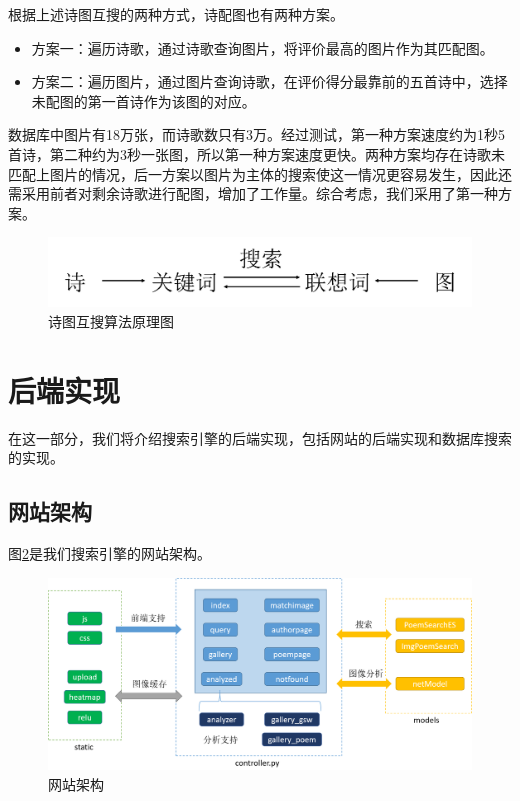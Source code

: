 \documentclass[a4paper, 10pt]{article}
\begin{document}
根据上述诗图互搜的两种方式，诗配图也有两种方案。
\begin{itemize}
    \item 方案一：遍历诗歌，通过诗歌查询图片，将评价最高的图片作为其匹配图。
    \item 方案二：遍历图片，通过图片查询诗歌，在评价得分最靠前的五首诗中，选择未配图的第一首诗作为该图的对应。
\end{itemize}

数据库中图片有18万张，而诗歌数只有3万。经过测试，第一种方案速度约为1秒5首诗，第二种约为3秒一张图，所以第一种方案速度更快。两种方案均存在诗歌未匹配上图片的情况，后一方案以图片为主体的搜索使这一情况更容易发生，因此还需采用前者对剩余诗歌进行配图，增加了工作量。综合考虑，我们采用了第一种方案。
\begin{figure}[H]
\centering
\includegraphics[width=0.8\linewidth]{fig/poemimg.png}
\caption{诗图互搜算法原理图}
\label{fig:poemimg}
\end{figure}


\section{后端实现}
在这一部分，我们将介绍搜索引擎的后端实现，包括网站的后端实现和数据库搜索的实现。

\subsection{网站架构}
图\ref{fig:web_struct}是我们搜索引擎的网站架构。

\begin{figure}[H]
\centering
\includegraphics[scale=0.48]{fig/web_struct.png}
\caption{网站架构}
\label{fig:web_struct}
\end{figure}
\end{document}
